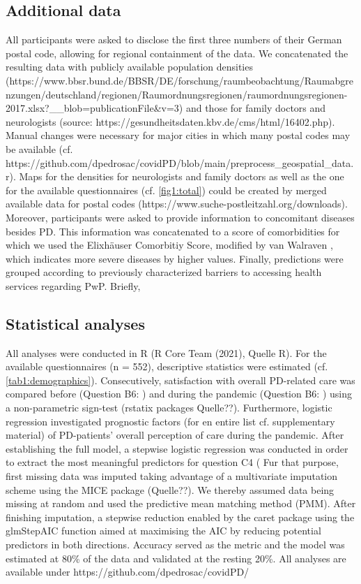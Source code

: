\documentclass{bmcart}
\begin{document}
\subsection*{Additional data}
All participants were asked to disclose the first three numbers of their German postal code, allowing for regional containment of the data. We concatenated the resulting data with publicly available population densities (https://www.bbsr.bund.de/BBSR/DE/forschung/raumbeobachtung/Raumabgrenzungen/deutschland/regionen/Raumordnungsregionen/raumordnungsregionen-2017.xlsx?\_\_blob=publicationFile\&v=3) and those for family doctors and neurologists (source: https://gesundheitsdaten.kbv.de/cms/html/16402.php). Manual changes were necessary for major cities in which many postal codes may be available (cf. https://github.com/dpedrosac/covidPD/blob/main/preprocess\_geospatial\_data.r). Maps for the densities for neurologists and family doctors as well as the one for the available questionnaires (cf. \ref{fig1:total}) could be created by merged available data for postal codes (https://www.suche-postleitzahl.org/downloads). 
Moreover, participants were asked to provide information to concomitant diseases besides PD. This information was concatenated to a score of comorbidities for which we used the Elixhäuser Comorbitiy Score, modified by van Walraven \cite {van2009modification}, which indicates more severe diseases by higher values. Finally, predictions were grouped according to previously characterized barriers to accessing health services regarding PwP\cite {zaman2021barriers}. Briefly, 

\subsection*{Statistical analyses}
All analyses were conducted in R (R Core Team (2021), Quelle R). For the available questionnaires (n = 552), descriptive statistics were estimated (cf. \ref{tab1:demographics}). Consecutively, satisfaction with overall PD-related care was compared before (Question B6: ) and during the pandemic (Question B6: ) using a non-parametric sign-test (rstatix packages Quelle??). Furthermore, logistic regression investigated prognostic factors (for en entire list cf. supplementary material) of PD-patients' overall perception of care during the pandemic. After establishing the full model, a stepwise logistic regression was conducted in order to extract the most meaningful predictors for question C4 ( %
Fur that purpose, first missing data was imputed taking advantage of a multivariate imputation scheme using the MICE package (Quelle??). We thereby assumed data being missing at random and used the predictive mean matching method (PMM). After finishing imputation, a stepwise reduction enabled by the caret package using the glmStepAIC function aimed at maximising the AIC by reducing potential predictors in both directions. Accuracy served as the metric and the model was estimated at 80\% of the data and validated at the resting 20\%. All analyses are available under https://github.com/dpedrosac/covidPD/
\end{document}
